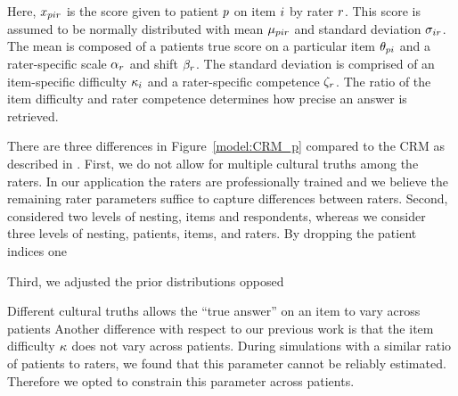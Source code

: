\documentclass[a4paper,11pt]{article}
\begin{document}
Here, $x_{pir}$ is the score given to patient $p$ on item $i$ by rater $r$.
This score is assumed to be normally distributed with mean $\mu_{pir}$ and standard deviation $\sigma_{ir}$.
The mean is composed of a patients true score on a particular item $\theta_{pi}$ and a rater-specific scale $\alpha_r$ and shift $\beta_r$.
The standard deviation is comprised of an item-specific difficulty $\kappa_i$ and a rater-specific competence $\zeta_r$.
The ratio of the item difficulty and rater competence determines how precise an answer is retrieved.

There are three differences in Figure~\ref{model:CRM_p} compared to the CRM as described in \textcite{anders2014cultural}.
First, we do not allow for multiple cultural truths among the raters.
In our application the raters are professionally trained and we believe the remaining rater parameters suffice to capture differences between raters.
Second, \parencite{anders2014cultural} considered two levels of nesting, items and respondents, whereas we consider three levels of nesting, patients, items, and raters.
By dropping the patient indices one

Third, we adjusted the prior distributions opposed


Different cultural truths allows the ``true answer'' on an item to vary across patients
Another difference with respect to our previous work \parencite{vandenBergh2020cultural} is that the item difficulty $\kappa$ does not vary across patients.
During simulations with a similar ratio of patients to raters, we found that this parameter cannot be reliably estimated.
Therefore we opted to constrain this parameter across patients.
\end{document}

